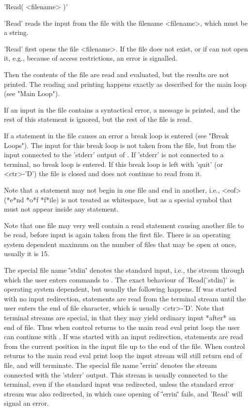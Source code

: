 'Read( <filename> )'

'Read' reads the input from the  file with the filename <filename>, which
must be a string.

'Read' first opens the file <filename>.   If the file  does not exist, or
if {\GAP} can not open it, e.g., because of access restrictions, an error
is signalled.

Then the contents of the file are read and evaluated, but the results are
not printed.  The  reading and printing happens exactly  as described for
the main loop (see "Main Loop").

If an   input in  the file contains   a syntactical  error, a message  is
printed, and the rest of  this statement is ignored,  but the rest of the
file is read.

If a statement in the file  causes an error  a break loop is entered (see
"Break Loops").   The  input for this break  loop  is not taken  from the
file, but from the input connected to the 'stderr'  output of {\GAP}.  If
'stderr'  is not connected to  a terminal, no  break loop is entered.  If
this break loop is left with 'quit' (or <ctr>-'D') the file is closed and
{\GAP} does not continue to read from it.

Note that a statement may not begin in one file and end in another, i.e.,
<eof> (*e*nd *o*f *f*ile) is not treated as  whitespace, but as a special
symbol that must not appear inside any statement.

Note that one file may very well contain a read statement causing another
file to  be read, before input is again taken from the first file.  There
is an operating  system dependent maximum on the number of files that may
be open at once, usually it is 15.

The special  file name '\"\*stdin\*\"'  denotes the standard input, i.e.,
the stream through  which the user  enters commands to {\GAP}.  The exact
behaviour of  'Read( \"\*stdin\*\" )'  is operating system dependent, but
usually  the  following happens.   If {\GAP}   was started  with no input
redirection, statements are read from  the terminal stream until the user
enters the end of file character,  which is usually <ctr>-'D'.  Note that
terminal  streams are special,  in that  they  may  yield ordinary  input
*after* an end of file.  Thus when control returns to the main read eval
print loop the user can continue with {\GAP}.  If {\GAP} was started with
an input  redirection, statements are read  from the current  position in
the input file up  to the end of the  file.  When control returns  to the
main read eval print loop the input stream will still return end of file,
and {\GAP} will terminate.  The special file name '\"\*errin\*\"' denotes
the stream  connected with the 'stderr' output.   This stream  is usually
connected  to the terminal,  even if  the standard  input was redirected,
unless  the  standard error  stream was  also  redirected, in  which case
opening of '\"\*errin\*\"' fails, and 'Read' will signal an error.

